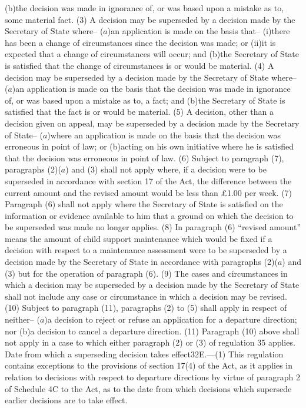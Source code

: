 \documentclass[12pt,a4paper]{article}
\begin{document}
(b)the decision was made in ignorance of, or was based upon a mistake as to, some material fact.
(3) A decision may be superseded by a decision made by the Secretary of State where–
($a$)an application is made on the basis that–
(i)there has been a change of circumstances since the decision was made; or
(ii)it is expected that a change of circumstances will occur; and
(b)the Secretary of State is satisfied that the change of circumstances is or would be material.
(4) A decision may be superseded by a decision made by the Secretary of State where–
($a$)an application is made on the basis that the decision was made in ignorance of, or was based upon a mistake as to, a fact; and
(b)the Secretary of State is satisfied that the fact is or would be material.
(5) A decision, other than a decision given on appeal, may be superseded by a decision made by the Secretary of State–
($a$)where an application is made on the basis that the decision was erroneous in point of law; or
(b)acting on his own initiative where he is satisfied that the decision was erroneous in point of law.
(6) Subject to paragraph (7), paragraphs (2)($a$) and (3) shall not apply where, if a decision were to be superseded in accordance with section 17 of the Act, the difference between the current amount and the revised amount would be less than £1.00 per week.
(7) Paragraph (6) shall not apply where the Secretary of State is satisfied on the information or evidence available to him that a ground on which the decision to be superseded was made no longer applies.
(8) In paragraph (6) “revised amount” means the amount of child support maintenance which would be fixed if a decision with respect to a maintenance assessment were to be superseded by a decision made by the Secretary of State in accordance with paragraphs (2)($a$) and (3) but for the operation of paragraph (6).
(9) The cases and circumstances in which a decision may be superseded by a decision made by the Secretary of State shall not include any case or circumstance in which a decision may be revised.
(10) Subject to paragraph (11), paragraphs (2) to (5) shall apply in respect of neither–
($a$)a decision to reject or refuse an application for a departure direction; nor
(b)a decision to cancel a departure direction.
(11) Paragraph (10) above shall not apply in a case to which either paragraph (2) or (3) of regulation 35 applies.
Date from which a superseding decision takes effect32E.—(1) This regulation contains exceptions to the provisions of section 17(4) of the Act, as it applies in relation to decisions with respect to departure directions by virtue of paragraph 2 of Schedule 4C to the Act, as to the date from which decisions which supersede earlier decisions are to take effect.
\end{document}
